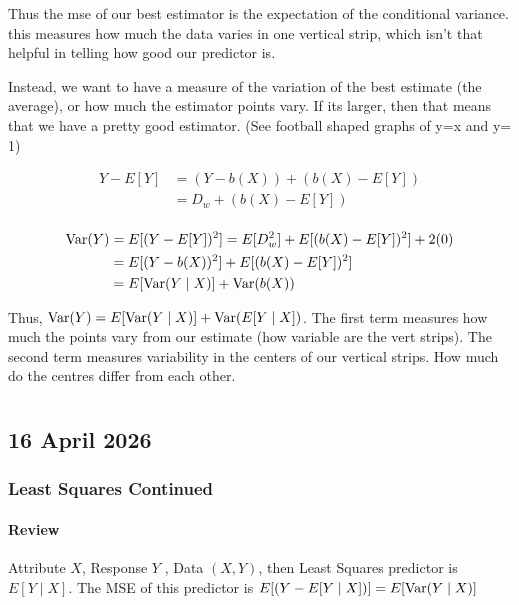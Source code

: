 \documentclass{report}
\begin{document}
Thus the mse of our best estimator is the expectation of the conditional variance. this measures how much the data varies in one vertical strip, which isn't that helpful in telling how good our predictor is. 

Instead, we want to have a measure of the variation of the best estimate (the average), or how much the estimator points vary. If its larger, then that means that we have a pretty good estimator. (See football shaped graphs of y=x and y= 1) 

\begin{align*}
	Y-E[Y] &= (Y-b(X)) + (b(X) - E[Y]) \\
	&= D_{w} + (b(X) - E[Y]) \\
\end{align*}

\begin{align*}
	\operatorname{Var}(Y) &= E[(Y-E[Y])^{2}] = E[D_{w}^{2}] + E[(b(X) - E[Y])^{2}] + 2(0) \\
	&= E[(Y - b(X))^{2}] + E[(b(X) - E[Y])^{2}] \\
	&= E[\operatorname{Var}(Y \mid X)] + \operatorname{Var}(b(X)) \\
\end{align*}


Thus, $\operatorname{Var}(Y) = E[\operatorname{Var}(Y \mid X)] + \operatorname{Var}(E[Y \mid X])$. The first term measures how much the points vary from our estimate (how variable are the vert strips). The second term measures variability in the centers of our vertical strips. How much do the centres differ from each other. 

\chapter{}
\section{16 April 2026}

\subsection{Least Squares Continued} 

\subsubsection{Review}
Attribute $X$, Response $Y$ , Data $(X,Y)$, then Least Squares predictor is $E[Y \mid X]$. The MSE of this predictor is $E[(Y - E[Y \mid X])] = E[\operatorname{Var}(Y \mid X)]$ 
\end{document}
